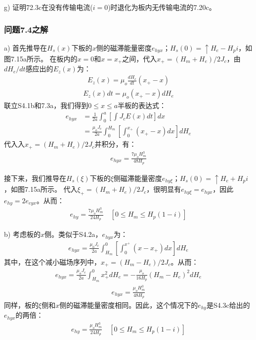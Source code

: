 g) 证明72.3c在没有传输电流($i=0$)时退化为板内无传输电流的7.20c。


\subsubsection{问题7.4之解}
a) 首先推导在$H_s(x)$下板的$x$侧的磁滞能量密度$e_{hyx}$；$H_s(0)=\uparrow H_e-H_p i$，如图7.15a所示。
在板内的$x=0$和$x=x_+$之间，代入$x_+=(H_m+H_e)/2J_c$，由$dH_e/dt$感应出的$E_z(x)$为：
\begin{align*}%
E_z(x)=\mu_o\frac{dH_e}{dt}(x_+-x) \tag{S4.1a}
\end{align*}
\begin{align*}%
E_z(x)dt=\mu_o(x_+-x)dH_e \tag{S4.1b}
\end{align*}
联立S4.1b和7.3a，我们得到$0\le x\le a$半板的表达式：
\begin{align*}%
e_{hyx}&=\frac{1}{2a}\int_{0}^{a}\left[\int J_cE(x)dt\right]dx\\
&=\frac{\mu_oJ_c}{2a}\int_{0}^{H_m}\left[\int_{0}^{x_+}(x_+-x)dx\right]dH_e \tag{S4.2a}
\end{align*}
代入入$x_+=(H_m+H_e)/2J_c$并积分，有：
\begin{align*}%
e_{hyx}=\frac{7\mu_oH_{m}^{3}}{48H_p} \tag{S4.2b}
\end{align*}

接下来，我们推导在$H_s(\xi)$下板的$\xi$侧磁滞能量密度$e_{hy\xi}$；$H_s(0)=\uparrow H_e+H_p i$，如图7.15a所示。
代入$\xi_+=(H_m+H_e)/2J_c$，很明显有$e_{hy\xi}=e_{hyx}$，因此$e_{hy}=2e_{eyx}$。从而：
\begin{align*}%
e_{hy}=\frac{7\mu_oH_{m}^{3}}{24H_p}  \quad  [0\leq H_m\leq H_p(1-i)] \tag{7.22a}
\end{align*}

b) 考虑板的$x$侧。类似于S4.2a，$e_{hyx}$为：
\begin{align*}
e_{hyx}=\frac{\mu_0 J_c}{2a}\int_{H_m}^{0}\left[\int_{0}^{x^+}(x-x_+)dx\right]dH_e \tag{S4.3a}
\end{align*}
其中，在这个减小磁场序列中，$x_+=(H_m-H_e)/2J_c$。从而：
\begin{align*}%
e_{hyx}=\frac{\mu_oJ_c}{2a}\int_{H_m}^{0}x_{+}^{2}dH_e=-\frac{\mu_o}{16H_p}(H_m-H_e)^2dH_e  \tag{S4.3b}
\end{align*}
\begin{align*}
e_{hyx}=\frac{\mu_oH_{m}^{3}}{48H_p} \tag{S4.3c}
\end{align*}
同样，板的$\xi$侧和$x$侧的磁滞能量密度相同。因此，这个情况下的$e_{hy}$是S4.3c给出的$e_{hyx}$的两倍：
\begin{align*}%
e_{hy}=\frac{\mu_oH_{m}^{3}}{24H_p}   \quad     [0\leq H_m\leq H_p(1-i)] \tag{7.22b}
\end{align*}

